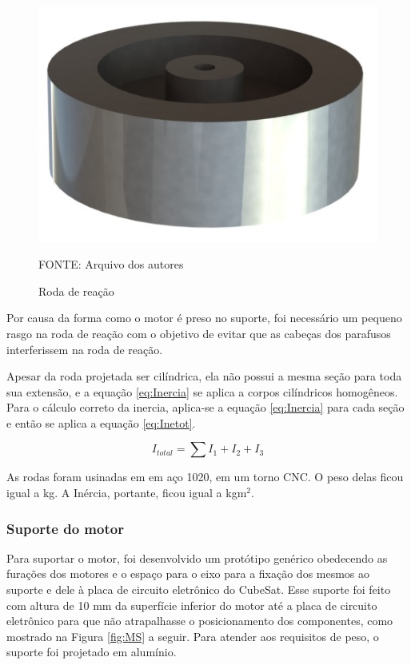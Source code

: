 \documentclass[
	12pt,				%
	openany,			%
	twoside,			%
	a4paper,			%
	english,			%
	french,				%
	spanish,			%
	brazil,				%
	oldfontcommands
	]{abntex2}
\begin{document}
\begin{figure}[th]
	\caption{Roda de reação}
	\centering
	\includegraphics[width=0.5\linewidth]{./figs/Reaction_Wheel}
	
	\begin{small}
		FONTE: Arquivo dos autores
	\end{small}
	\label{fig:RW}
\end{figure}

Por causa da forma como o motor é preso no suporte, foi necessário um pequeno rasgo na roda de reação com o objetivo de evitar que as cabeças dos parafusos interferissem na roda de reação.

Apesar da roda projetada ser cilíndrica, ela não possui a mesma seção para toda sua extensão, e a equação \ref{eq:Inercia} se aplica a corpos cilíndricos homogêneos. Para o cálculo correto da inercia, aplica-se a equação \ref{eq:Inercia} para cada seção e então se aplica a equação \ref{eq:Inetot}.

\begin{equation}
I_{total} = \sum\nolimits I_{1} + I_{2} + I_{3}
\label{eq:Inetot}
\end{equation}

As rodas foram usinadas em em aço 1020, em um torno CNC. O peso delas ficou igual a  kg. A Inércia, portante, ficou igual a  kgm$^2$.

\subsubsection{Suporte do motor}

Para suportar o motor, foi desenvolvido um protótipo genérico obedecendo as furações dos motores e o espaço para o eixo para a fixação dos mesmos ao suporte e dele à placa de circuito eletrônico do CubeSat. Esse suporte foi feito com altura de 10 mm da superfície inferior do motor até a placa de circuito eletrônico para que não atrapalhasse o posicionamento dos componentes, como mostrado na Figura \ref{fig:MS} a seguir. Para atender aos requisitos de peso, o suporte foi projetado em alumínio.
\end{document}
